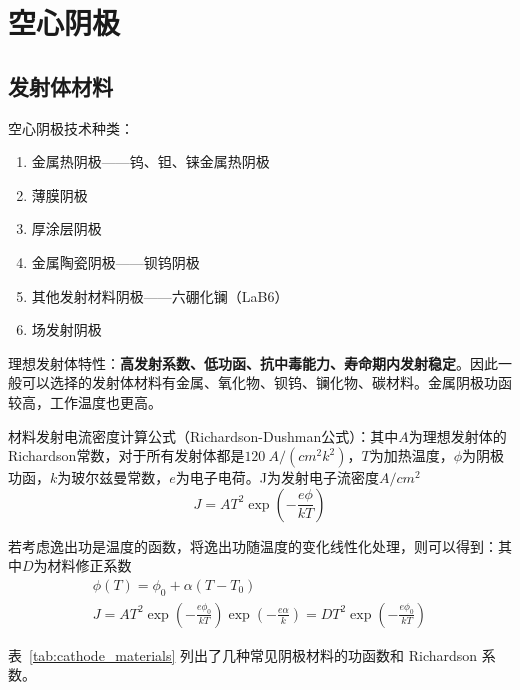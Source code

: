\chapter{空心阴极}

\section{发射体材料}

  空心阴极技术种类：
  \begin{enumerate}
    \item 金属热阴极——钨、钽、铼金属热阴极
    \item 薄膜阴极
    \item 厚涂层阴极
    \item 金属陶瓷阴极——钡钨阴极
    \item 其他发射材料阴极——六硼化镧（LaB6）
    \item 场发射阴极
  \end{enumerate}

  理想发射体特性：\textbf{高发射系数、低功函、抗中毒能力、寿命期内发射稳定}。因此一般可以选择的发射体材料有金属、氧化物、钡钨、镧化物、碳材料。金属阴极功函较高，工作温度也更高。

  材料发射电流密度计算公式（Richardson-Dushman公式）：其中$A$为理想发射体的Richardson常数，对于所有发射体都是$120 \ A/(cm^2 k^2)$，$T$为加热温度，$\phi$为阴极功函，$k$为玻尔兹曼常数，$e$为电子电荷。J为发射电子流密度$ A/ cm^2$
  \begin{equation}
    J = A T^2 \exp\left(-\frac{e \phi}{kT}\right)
  \end{equation}
  
  若考虑逸出功是温度的函数，将逸出功随温度的变化线性化处理，则可以得到：其中$D$为材料修正系数
  \begin{gather}
    \phi(T) = \phi_0 + \alpha (T - T_0) \\
    J = A T^2 \exp\left(-\frac{e \phi_0}{kT}\right) \exp\left(-\frac{e \alpha}{k}\right) = D T^2 \exp\left(-\frac{e \phi_0}{kT}\right)
  \end{gather}

  表~\ref{tab:cathode_materials} 列出了几种常见阴极材料的功函数和 Richardson 系数。

